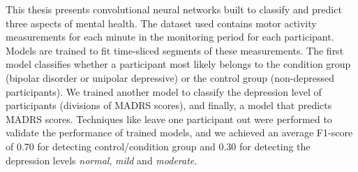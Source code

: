 This thesis presents convolutional neural networks built to classify and predict three aspects of mental health. The dataset used contains motor activity measurements for each minute in the monitoring period for each participant. Models are trained to fit time-sliced segments of these measurements. The first model classifies whether a participant most likely belongs to the condition group (bipolar disorder or unipolar depressive) or the control group (non-depressed participants). We trained another model to classify the depression level of participants (divisions of MADRS scores), and finally, a model that predicts MADRS scores. Techniques like leave one participant out were performed to validate the performance of trained models, and we achieved an average F1-score of 0.70 for detecting control/condition group and 0.30 for detecting the depression levels \emph{normal}, \emph{mild} and \emph{moderate}.